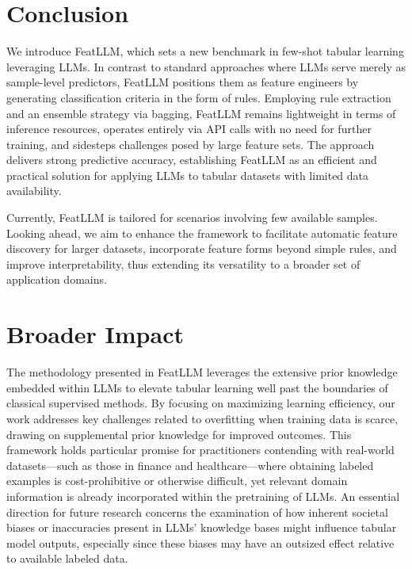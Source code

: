 \section{Conclusion}
We introduce \textsf{FeatLLM}, which sets a new benchmark in few-shot tabular learning leveraging LLMs. In contrast to standard approaches where LLMs serve merely as sample-level predictors, \textsf{FeatLLM} positions them as feature engineers by generating classification criteria in the form of rules. Employing rule extraction and an ensemble strategy via bagging, \textsf{FeatLLM} remains lightweight in terms of inference resources, operates entirely via API calls with no need for further training, and sidesteps challenges posed by large feature sets. The approach delivers strong predictive accuracy, establishing \textsf{FeatLLM} as an efficient and practical solution for applying LLMs to tabular datasets with limited data availability.

Currently, \textsf{FeatLLM} is tailored for scenarios involving few available samples. Looking ahead, we aim to enhance the framework to facilitate automatic feature discovery for larger datasets, incorporate feature forms beyond simple rules, and improve interpretability, thus extending its versatility to a broader set of application domains.

\section{Broader Impact} The methodology presented in \textsf{FeatLLM} leverages the extensive prior knowledge embedded within LLMs to elevate tabular learning well past the boundaries of classical supervised methods. By focusing on maximizing learning efficiency, our work addresses key challenges related to overfitting when training data is scarce, drawing on supplemental prior knowledge for improved outcomes. This framework holds particular promise for practitioners contending with real-world datasets—such as those in finance and healthcare—where obtaining labeled examples is cost-prohibitive or otherwise difficult, yet relevant domain information is already incorporated within the pretraining of LLMs. An essential direction for future research concerns the examination of how inherent societal biases or inaccuracies present in LLMs’ knowledge bases might influence tabular model outputs, especially since these biases may have an outsized effect relative to available labeled data.

